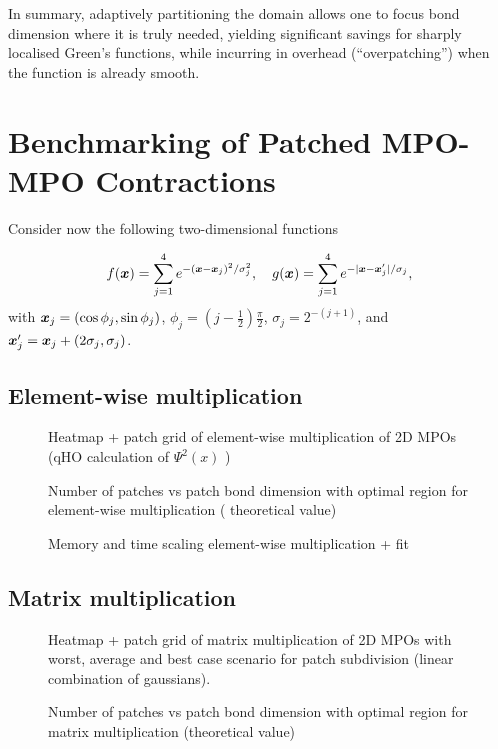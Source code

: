 In summary, adaptively partitioning the domain allows one to focus bond dimension where it is truly needed, yielding significant savings for sharply localised Green’s functions, while incurring in overhead (``overpatching'') when the function is already smooth.

\section{Benchmarking of Patched MPO-MPO Contractions}
\label{sec:benchmarkMPOMPOContr}
Consider now the following two-dimensional functions

\begin{align}
f(\boldsymbol{x}) = \sum_{j=1}^4 e^{-(\boldsymbol{x} - \boldsymbol{x}_j)^2/\sigma^2_j}, \quad  
g(\boldsymbol{x}) = \sum_{j=1}^4 e^{-|\boldsymbol{x} - \boldsymbol{x}'_j|/\sigma_j}, 
\label{eq:linearGauss}
\end{align}
with $\boldsymbol{x}_j = (\cos \phi_j, \sin \phi_j )$, $\phi_j = (j-\frac{1}{2}) \frac{\pi}{2}$, $\sigma_j =  2^{-(j+1)}$, and $\boldsymbol{x}'_j =\boldsymbol{x}_j + (2\sigma_j,
\sigma_j)$.


\subsection{Element-wise multiplication}
\begin{figure}[ht!]
    \caption{Heatmap + patch grid of element-wise multiplication of 2D MPOs (qHO calculation of $\Psi^2(x)$ ) }
\end{figure}

\begin{figure}[ht!]
    \caption{Number of patches vs patch bond dimension with optimal region for element-wise multiplication ( theoretical value) }
\end{figure}

\begin{figure}[ht!]
    \caption{Memory and time scaling element-wise multiplication + fit  }
\end{figure}

\subsection{Matrix multiplication}
\begin{figure}[ht!]
    \caption{Heatmap + patch grid of matrix multiplication of 2D MPOs with worst, average and best case scenario for patch subdivision (linear combination of gaussians). }
\end{figure}

\begin{figure}[ht!]
    \caption{Number of patches vs patch bond dimension with optimal region for matrix multiplication (theoretical value) }
\end{figure}

